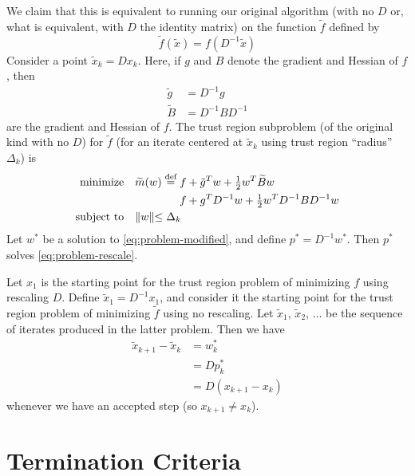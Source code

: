\documentclass[11pt]{article}
\begin{document}
We claim that this is equivalent to running our original algorithm
(with no $D$ or, what is equivalent, with $D$ the identity matrix)
on the function $\tilde{f}$ defined by
$$
   \tilde{f}(\tilde{x}) = f(D^{-1} \tilde{x})
$$
Consider a point $\tilde{x}_k = D x_k$.  Here, if $g$ and $B$ denote
the gradient and Hessian of $f$, then
\begin{subequations}
\begin{align}
   \tilde{g} & = D^{-1} g
   \label{eq:modified-gradient}
   \\
   \widetilde{B} & = D^{-1} B D^{-1}
   \label{eq:modified-hessian}
\end{align}
\end{subequations}
are the gradient and Hessian of $f$.  The trust region subproblem
(of the original kind with no $D$)
for $\tilde{f}$ (for an iterate centered at $\tilde{x}_k$ using
trust region ``radius'' $\Delta_k$) is
\begin{equation} \label{eq:problem-modified}
\begin{split}
   \text{minimize} &
   \quad \widetilde{m}(w) \stackrel{\text{def}}{=}
   f + \tilde{g}^T w + \tfrac{1}{2} w^T \widetilde{B} w
   \\
   & \hphantom{\quad \widetilde{m}(w) \stackrel{\text{def}}{=} \vphantom{f}}
   f + g^T D^{-1} w + \tfrac{1}{2} w^T D^{-1} B D^{-1} w
   \\
   \text{subject to} & \quad \lVert w \lVert \le \Delta_k
\end{split}
\end{equation}
Let $w^*$ be a solution to \eqref{eq:problem-modified}, and
define $p^* = D^{-1} w^*$.  Then $p^*$ solves \eqref{eq:problem-rescale}.

Let $x_1$ is the starting point for the trust region problem
of minimizing $f$ using rescaling $D$.
Define $\tilde{x}_1 = D^{-1} x_1$, and consider it
the starting point for the trust region problem
of minimizing $\tilde{f}$ using no rescaling.
Let $\tilde{x}_1$, $\tilde{x}_2$, $\ldots$ be the sequence of iterates
produced in the latter problem.  Then we have
\begin{align*}
   \tilde{x}_{k + 1} - \tilde{x}_k
   & =
   w^*_k
   \\
   & =
   D p^*_k
   \\
   & =
   D (x_{k + 1} - x_k)
\end{align*}
whenever we have an accepted step (so $x_{k + 1} \neq x_k$).

\section{Termination Criteria}
\end{document}

